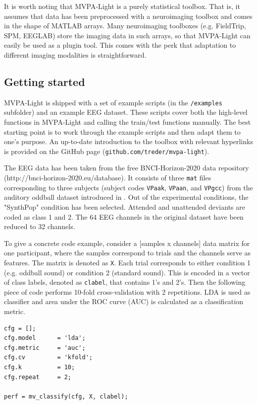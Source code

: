 \documentclass[utf8]{frontiersSCNS} %
\newcommand{\ttt}[1]{\texttt{#1}}
\begin{document}
It is worth noting that MVPA-Light is a purely statistical toolbox. That is, it assumes that data has been preprocessed with a neuroimaging toolbox and comes in the shape of MATLAB arrays. Many neuroimaging toolboxes (e.g. FieldTrip, SPM, EEGLAB) store the imaging  data in such arrays, so that MVPA-Light can easily be used as a plugin tool. This comes with the perk that adaptation to different imaging modalities is straightforward.

\subsection{Getting started}

MVPA-Light is shipped with a set of example scripts (in the \ttt{/examples} subfolder) and an example EEG dataset. These scripts cover both the high-level functions in MVPA-Light and calling the train/test functions manually. The best starting point is to work through the example scripts and then adapt them to one's purpose. An up-to-date introduction to the toolbox with relevant hyperlinks is provided on the GitHub page (\ttt{github.com/treder/mvpa-light}).

The EEG data has been taken from the free BNCI-Horizon-2020 data repository (http://bnci-horizon-2020.eu/database). It consists of three \ttt{mat} files corresponding to three subjects (subject codes \ttt{VPaak}, \ttt{VPaan}, and \ttt{VPgcc}) from the auditory oddball dataset introduced in \cite{Treder2014}. Out of the experimental conditions, the "SynthPop" condition has been selected. Attended and unattended deviants are coded as class 1 and 2. The 64 EEG channels in the original dataset have been reduced to 32 channels.

To give a concrete code example, consider a [samples x channels] data matrix for one participant, where the samples correspond to trials and the channels serve as features. The matrix is denoted as \ttt{X}. Each trial corresponds to either condition 1 (e.g. oddball sound) or condition 2 (standard sound). This is encoded in a vector of class labels, denoted as \ttt{clabel}, that contains 1's and 2's. Then the following piece of code performs 10-fold cross-validation with 2 repetitions. LDA is used as classifier and area under the ROC curve (AUC) is calculated as a classification metric.

\begin{verbatim}
cfg = [];
cfg.model      = 'lda';
cfg.metric     = 'auc';
cfg.cv         = 'kfold';
cfg.k          = 10;
cfg.repeat     = 2;

perf = mv_classify(cfg, X, clabel);
\end{verbatim}
\end{document}
